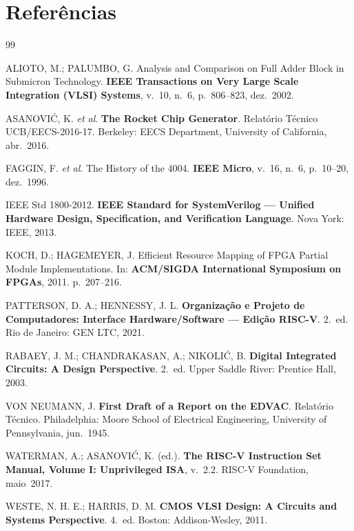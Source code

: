\documentclass[12pt,a4paper]{article}
\begin{document}
\section*{Referências}

\begin{thebibliography}{99}
\setlength{\itemsep}{6pt}

  ALIOTO, M.; PALUMBO, G\@.
  Analysis and Comparison on Full Adder Block in Submicron Technology.
  \textbf{IEEE Transactions on Very Large Scale Integration (VLSI) Systems},
  v.~10, n.~6, p.~806--823, dez.\ 2002.

  ASANOVIĆ, K\@. \textit{et al}.
  \textbf{The Rocket Chip Generator}.
  Relatório Técnico UCB/EECS-2016-17. Berkeley: EECS Department, University of California, abr.\ 2016.

  FAGGIN, F\@. \textit{et al}.
  The History of the 4004.
  \textbf{IEEE Micro}, v.~16, n.~6, p.~10--20, dez.\ 1996.

  IEEE Std 1800-2012.
  \textbf{IEEE Standard for SystemVerilog --- Unified Hardware Design,
  Specification, and Verification Language}.
  Nova York: IEEE, 2013.

  KOCH, D\@.; HAGEMEYER, J\@.
  Efficient Resource Mapping of FPGA Partial Module Implementations.
  In: \textbf{ACM/SIGDA International Symposium on FPGAs}, 2011.
  p.~207--216.

  PATTERSON, D\@. A\@.; HENNESSY, J\@. L\@.
  \textbf{Organização e Projeto de Computadores: Interface Hardware/Software
  --- Edição RISC-V}. 2.~ed.
  Rio de Janeiro: GEN LTC, 2021.

  RABAEY, J\@. M\@.; CHANDRAKASAN, A\@.; NIKOLIĆ, B\@.
  \textbf{Digital Integrated Circuits: A Design Perspective}. 2.~ed.
  Upper Saddle River: Prentice Hall, 2003.

  VON NEUMANN, J\@.
  \textbf{First Draft of a Report on the EDVAC}.
  Relatório Técnico. Philadelphia: Moore School of Electrical Engineering,
  University of Pennsylvania, jun.\ 1945.

  WATERMAN, A\@.; ASANOVIĆ, K\@. (ed.).
  \textbf{The RISC-V Instruction Set Manual, Volume I: Unprivileged ISA},
  v.~2.2. RISC-V Foundation, maio~2017.

  WESTE, N\@. H\@. E\@.; HARRIS, D\@. M\@.
  \textbf{CMOS VLSI Design: A Circuits and Systems Perspective}. 4.~ed.
  Boston: Addison-Wesley, 2011.

\end{thebibliography}
\end{document}
